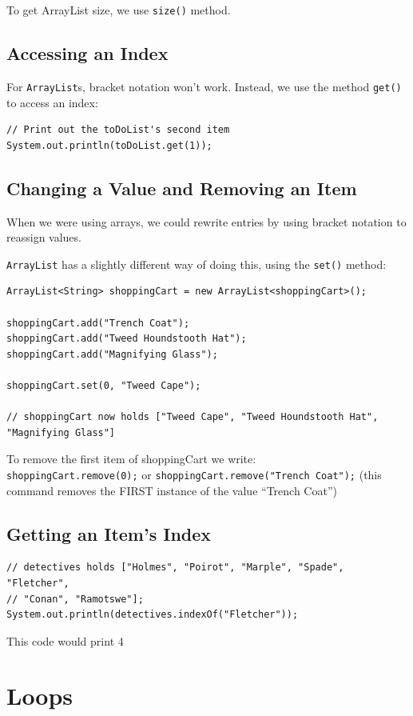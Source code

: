 \documentclass[a4paper, 12pt]{article}
\begin{document}
To get ArrayList size, we use \verb|size()| method.

\subsection{Accessing an Index}
For \verb|ArrayList|s, bracket notation won't work. Instead, we use the method \verb|get()| to access an index:
\begin{verbatim}
// Print out the toDoList's second item
System.out.println(toDoList.get(1));
\end{verbatim}

\subsection{Changing a Value and Removing an Item}
When we were using arrays, we could rewrite entries by using bracket notation to reassign values.

\verb|ArrayList| has a slightly different way of doing this, using the \verb|set()| method:
\begin{verbatim}
ArrayList<String> shoppingCart = new ArrayList<shoppingCart>();

shoppingCart.add("Trench Coat");
shoppingCart.add("Tweed Houndstooth Hat");
shoppingCart.add("Magnifying Glass");

shoppingCart.set(0, "Tweed Cape");

// shoppingCart now holds ["Tweed Cape", "Tweed Houndstooth Hat", "Magnifying Glass"]
\end{verbatim}

To remove the first item of shoppingCart we write:\\
\verb|shoppingCart.remove(0);| or \verb|shoppingCart.remove("Trench Coat");| (this command removes the FIRST instance of the value ``Trench Coat'')

\subsection{Getting an Item's Index}
\begin{verbatim}
// detectives holds ["Holmes", "Poirot", "Marple", "Spade", "Fletcher", 
// "Conan", "Ramotswe"];
System.out.println(detectives.indexOf("Fletcher"));
\end{verbatim}
This code would print 4


\section{Loops}
\end{document}
